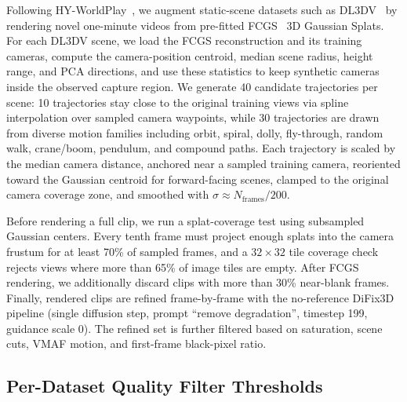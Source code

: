 Following HY-WorldPlay~\citep{hy_worldplay}, we augment static-scene datasets such as DL3DV~\citep{dl3dv} by rendering novel one-minute videos from pre-fitted FCGS~\citep{fcgs} 3D Gaussian Splats.
For each DL3DV scene, we load the FCGS reconstruction and its training cameras, compute the camera-position centroid, median scene radius, height range, and PCA directions, and use these statistics to keep synthetic cameras inside the observed capture region.
We generate 40 candidate trajectories per scene: 10 trajectories stay close to the original training views via spline interpolation over sampled camera waypoints, while 30 trajectories are drawn from diverse motion families including orbit, spiral, dolly, fly-through, random walk, crane/boom, pendulum, and compound paths.
Each trajectory is scaled by the median camera distance, anchored near a sampled training camera, reoriented toward the Gaussian centroid for forward-facing scenes, clamped to the original camera coverage zone, and smoothed with $\sigma \approx N_\text{frames}/200$.

\noindent Before rendering a full clip, we run a splat-coverage test using subsampled Gaussian centers.
Every tenth frame must project enough splats into the camera frustum for at least 70\% of sampled frames, and a $32{\times}32$ tile coverage check rejects views where more than 65\% of image tiles are empty.
After FCGS rendering, we additionally discard clips with more than 30\% near-blank frames.
Finally, rendered clips are refined frame-by-frame with the no-reference DiFix3D~\citep{difix3d} pipeline (single diffusion step, prompt ``remove degradation'', timestep 199, guidance scale 0).
The refined set is further filtered based on saturation, scene cuts, VMAF motion, and first-frame black-pixel ratio.




\subsection{Per-Dataset Quality Filter Thresholds}
\label{sec:appendix_filters}

